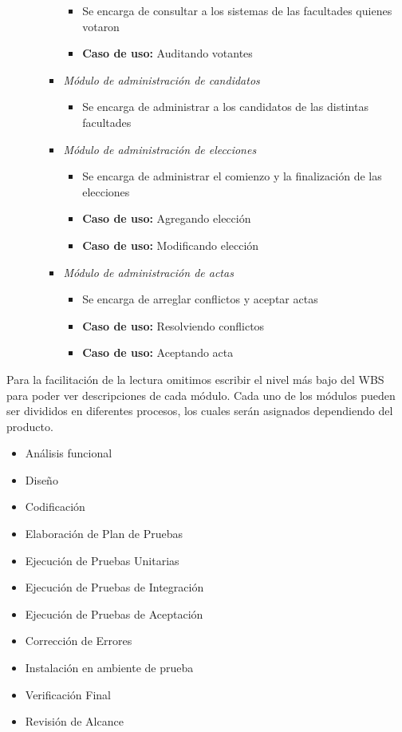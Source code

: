 \begin{itemize}
\begin{itemize}
\begin{itemize}
\begin{itemize}
 \item Se encarga de consultar a los sistemas de las facultades quienes votaron
 \item {\bf Caso de uso:} Auditando votantes
\end{itemize}
 \item \emph{M\'odulo de administración de candidatos}
\begin{itemize}
 \item Se encarga de administrar a los candidatos de las distintas facultades
\end{itemize}
 \item \emph{M\'odulo de administración de elecciones}
\begin{itemize}
 \item Se encarga de administrar el comienzo y la finalización de las elecciones
 \item {\bf Caso de uso:} Agregando elección
 \item {\bf Caso de uso:} Modificando elección
\end{itemize}
 \item \emph{M\'odulo de administración de actas}
\begin{itemize}
 \item Se encarga de arreglar conflictos y aceptar actas
 \item {\bf Caso de uso:} Resolviendo conflictos
 \item {\bf Caso de uso:} Aceptando acta
\end{itemize}
\end{itemize}
\end{itemize}
\end{itemize}


Para la facilitación de la lectura omitimos escribir el nivel más bajo del WBS para poder ver descripciones de cada m\'odulo. Cada uno de los m\'odulos pueden ser divididos en diferentes procesos,
los cuales serán asignados dependiendo del producto.
\begin{itemize}
 \item Análisis funcional
 \item Diseño
 \item Codificación
 \item Elaboración de Plan de Pruebas
 \item Ejecución de Pruebas Unitarias
 \item Ejecución de Pruebas de Integración
 \item Ejecución de Pruebas de Aceptación
 \item Corrección de Errores
 \item Instalación en ambiente de prueba
 \item Verificación Final
 \item Revisión de Alcance
\end{itemize}	
